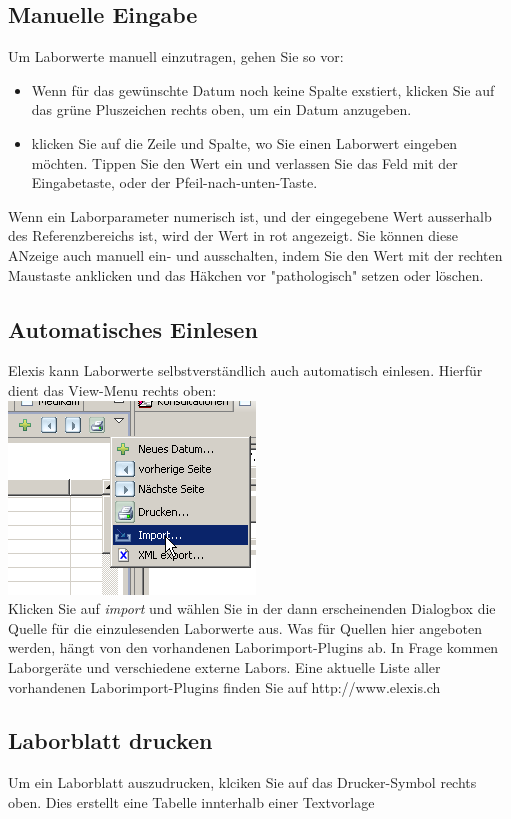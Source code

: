 \subsection{Manuelle Eingabe}
Um Laborwerte manuell einzutragen, gehen Sie so vor:
\begin{itemize}
    \item Wenn für das gewünschte Datum noch keine Spalte exstiert, klicken Sie auf das grüne Pluszeichen rechts oben, um ein Datum anzugeben.
    \item klicken Sie auf die Zeile und Spalte, wo Sie einen Laborwert eingeben möchten. Tippen Sie den Wert ein und verlassen Sie das Feld mit der Eingabetaste, oder der Pfeil-nach-unten-Taste.
\end{itemize} 
Wenn ein Laborparameter numerisch ist, und der eingegebene Wert ausserhalb des Referenzbereichs ist, wird der Wert in rot angezeigt. Sie können diese ANzeige auch manuell ein- und ausschalten, indem Sie den Wert mit der rechten Maustaste anklicken und das Häkchen vor "pathologisch" setzen oder löschen.

\subsection{Automatisches Einlesen}
Elexis kann Laborwerte selbstverständlich auch automatisch einlesen. Hierfür dient das View-Menu rechts oben:\\
\includegraphics{images/labor6}\\
Klicken Sie auf \textit{import} und wählen Sie in der dann erscheinenden Dialogbox die Quelle für die einzulesenden Laborwerte aus. Was für Quellen hier angeboten werden, hängt von den vorhandenen Laborimport-Plugins ab. In Frage kommen Laborgeräte und verschiedene externe Labors. Eine aktuelle Liste aller vorhandenen Laborimport-Plugins finden Sie auf http://www.elexis.ch

\subsection{Laborblatt drucken}
Um ein Laborblatt auszudrucken, klciken Sie auf das Drucker-Symbol rechts oben. Dies erstellt eine Tabelle innterhalb einer Textvorlage
 